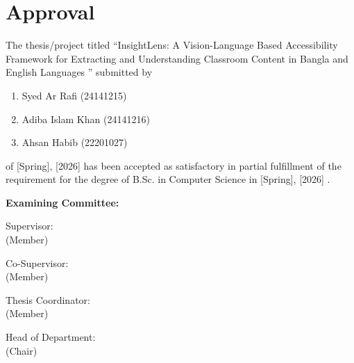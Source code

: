 \section*{Approval}

The thesis/project titled “InsightLens: A Vision-Language Based Accessibility Framework
for Extracting and Understanding Classroom Content in Bangla and English Languages ” submitted by 
\begin{enumerate}
  \item Syed Ar Rafi (24141215)
  \item Adiba Islam Khan (24141216)
  \item Ahsan Habib (22201027) 
\end{enumerate}

of [Spring], [2026] has been accepted as satisfactory in partial fulfillment of the requirement for the degree of B.Sc. in Computer Science in [Spring], [2026] . 

\vspace{0.5cm}
\textbf{Examining Committee:}

\vspace{1cm}

Supervisor:\\
(Member)
\begin{center}
    \hspace{7cm}  \hspace{1cm} 
\end{center}

Co-Supervisor:\\
(Member)
\begin{center}
    \hspace{7cm}  \hspace{1cm} 
\end{center}


Thesis Coordinator:\\
(Member)
\begin{center}
    \hspace{7cm}  \hspace{1cm} 
\end{center}

Head of Department:\\
(Chair)
\begin{center}
    \hspace{7cm}  \hspace{1cm} 
\end{center}

\pagebreak